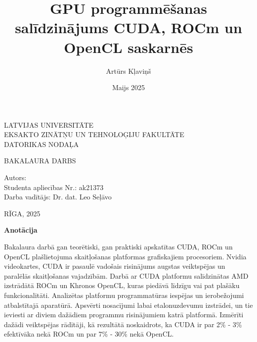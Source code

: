 \documentclass[12pt]{report}%
\author{Artūrs Kļaviņš}
\title{GPU programmēšanas salīdzinājums CUDA, ROCm un OpenCL saskarnēs}
\date{Maijs 2025}
\theoremstyle{definition}
\def\degree{Bakalaura darbs}
\def\faculty{Eksakto zinātņu un tehnoloģiju fakultāte}
\def\department{Datorikas nodaļa}
\def\vietlaiks{Rīga, 2025}
\def\supervisor{Darba vadītājs: Dr. dat. Leo Seļāvo}
\def\studaplieciba{ak21373}
\begin{document}
\thispagestyle{empty}
\makeatletter
   \begin{center}
       \vspace*{1cm}
        
    \vspace{10mm}
    {\Large LATVIJAS UNIVERSITĀTE\\
    \MakeUppercase{\faculty}\\
    \vspace{2mm}
    \MakeUppercase{\department}
    }
    \vspace*{10mm}
    
    
    
    \vspace{5mm}
    {\Large \MakeUppercase{\textbf{\@title}}}
    \vspace{5mm}
    

       \vspace{1cm}
    \Large
    \MakeUppercase{\degree}
    \end{center}
    \vspace{3cm}
    \begin{flushleft}
    \large
       Autors: \textbf{\large \@author}\\
       Studenta apliecības Nr.: \studaplieciba \\
       \supervisor
    \end{flushleft}

       \vfill
     
    \begin{center}
    \Large      
    \MakeUppercase{\vietlaiks}
   \end{center}
\makeatother

\newpage




\thispagestyle{empty}
\noindent \textbf{Anotācija}

\noindent Bakalaura darbā gan teorētiski, gan praktiski apskatītas CUDA, ROCm
un OpenCL  plašlietojuma skaitļošanas platformas grafiskajiem procesoriem.
Nvidia videokartes, CUDA ir pasaulē vadošais risinājums augstas veiktspējas un
paralēlās skaitļošanas vajadzībām. Darbā ar CUDA platformu salīdzinātas AMD
izstrādātā ROCm un Khronos OpenCL, kuras piedāvā līdzīgu vai pat plašāku
funkcionalitāti. Analizētas platformu programmatūras iespējas un ierobežojumi
atbalstītajā aparatūrā. Apsvērti nosacījumi labai etalonuzdevumu izstrādei, un
tie ieviesti ar diviem dažādiem programmu risinājumiem katrā platformā.
Izmērīti dažādi veiktspējas rādītāji, kā rezultātā noskaidrots, ka CUDA ir par
2\% - 3\% efektīvāka nekā ROCm un par 7\% - 30\% nekā OpenCL. 
\end{document}
